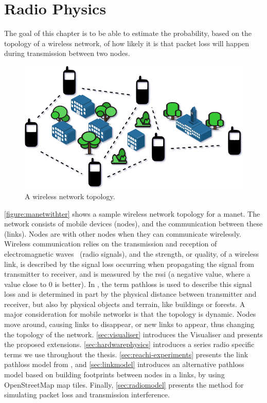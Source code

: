 \chapter{Radio Physics}\label{ch:radio-physics}
The goal of this chapter is to be able to estimate the probability, based on the topology of a wireless
network, of how likely it is that packet loss will happen during transmission between two nodes.


\begin{figure}[ht]
    \centering
    \includegraphics[width=.65\textwidth]{figures/manet_with_terrain.png}
    \caption{A wireless network topology.}
    \label{figure:manetwithter}
\end{figure}

\autoref{figure:manetwithter} shows a sample wireless network topology for a \acrfull{manet}. The network
consists of mobile devices (nodes), and the communication between these (links). Nodes are
 with other nodes when they can communicate wirelessly. Wireless communication relies on
the transmission and reception of electromagnetic waves~\cite[p.~10]{paper:linkmodel} (radio signals), and the
strength, or quality, of a wireless link, is described by the signal loss occurring when propagating the
signal from transmitter to receiver, and is measured by the \gls{rssi} (a negative value, where a value close
to 0 is better). In \cite{paper:linkmodel}, the term \gls{pathloss} is used to describe this signal loss and
is determined in part by the physical distance between transmitter and receiver, but also by physical objects
and terrain, like buildings or forests. A major consideration for mobile networks is that the topology is
dynamic. Nodes move around, causing links to disappear, or new links to appear, thus changing the topology of
the network. \autoref{sec:visualiser} introduces the Visualiser and presents the proposed extensions.
\autoref{sec:hardwarephysics} introduces a series radio specific terms we use throughout the thesis.
\autoref{sec:reachi-experiments} presents the link \gls{pathloss} model from \cite{paper:linkmodel}, and
\autoref{sec:linkmodel} introduces an alternative \gls{pathloss} model based on building footprints between
nodes in a links, by using OpenStreetMap map tiles. Finally, \autoref{sec:radiomodel} presents the method for
simulating packet loss and transmission interference.

